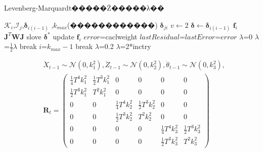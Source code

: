 \documentclass{article}
\begin{document}
\begin{CJK*}{GBK}{song}
\begin{algorithm}[h]
        \caption{Levenberg-Marquardt�����Ż�����λ��}
        \begin{algorithmic}[1] %
            \Require $\boldsymbol{\mathcal{K}}_{i}$,$\boldsymbol{\mathcal{I}}_{j}$,$\boldsymbol{\delta}_{i(i-1)}$
            ,$k_{max}$(������������)
            \Ensure $\boldsymbol{\delta}_{ji}$
                \State $v\gets 2$
                \State $\boldsymbol{\delta}\gets \boldsymbol{\delta}_{i(i-1)}$
                \State $\boldsymbol{f}_i$
                    \State $\boldsymbol{J}^{T}\boldsymbol{W}\boldsymbol{J}$
                    \State slove $\boldsymbol{\delta}^{*}$
                    \State update
                    \State $\boldsymbol{f}_i$
                    \State $error$=caclweight
                        \State $lastResidual$=$lastError$=$error$
                        \State $\lambda$=0
                        \Else
                        \State $\lambda$=$\frac{1}{2}\lambda$
                        \EndIf
                        \State break
                    \Else
                            \State $i$=$k_{max}-1$
                            \State break
                        \EndIf
                            \State $\lambda$=0.2
                        \Else
                        \State $\lambda$=2*inctry
                        \EndIf
                    \EndIf
                \EndWhile
                \EndFor
                \State \Return{$\boldsymbol{\delta}$}
            \EndFunction
        \end{algorithmic}
    \end{algorithm}


\begin{equation}\left.\begin{aligned}
&
\ddot{X}_{t-1}\sim \mathcal{N}(0,k^2_1),
\ddot{Z}_{t-1}   \sim \mathcal{N}(0,k^2_2),
\ddot{\theta}_{t-1}   \sim \mathcal{N}(0,k^2_3),
\\
& \boldsymbol{R}_t
=\begin{pmatrix}
\frac{1}{4}T^4 k^2_1 & \frac{1}{2}T^3k^2_1  & 0  & 0  & 0  & 0
\\
\frac{1}{2}T^3 k^2_1  & T^2 k^2_1  & 0  & 0  & 0  & 0
\\
0  & 0 &\frac{1}{4}T^4 k^2_2 & \frac{1}{2}T^3 k^2_2  & 0  & 0
\\
0  & 0 &\frac{1}{2}T^3 k^2_2 & T^2 k^2_2 & 0  & 0
\\
0  & 0 & 0  & 0 &\frac{1}{4}T^4 k^2_3 & \frac{1}{2}T^3  k^2_3
\\
0  & 0 & 0  & 0 &\frac{1}{2}T^3 k^2_3  & T^2  k^2_3
\end{pmatrix}
\end{aligned}\tag{3.4}\right.\end{equation}


\end{CJK*}
\end{document}
